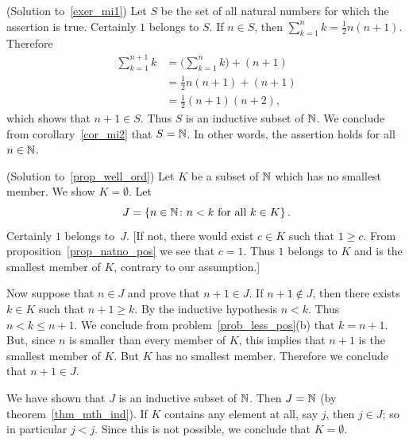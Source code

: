 \begin{prf}\label{sol_exer_mi1}(Solution to~\ref{exer_mi1})
Let $S$ be the set of all natural numbers for which the assertion is true.  Certainly $1$
belongs to $S$.  If $n \in S$, then $\sum_{k=1}^n k = \frac12 n(n + 1)$.  Therefore
 \begin{align*}
     \sum_{k=1}^{n+1}k &= \biggl(\sum_{k=1}^n k\biggr) + (n+1) \\
                       &= \frac12 n(n + 1) + (n + 1)           \\
                       &= \frac12(n + 1)(n + 2),
 \end{align*}
which shows that $n + 1 \in S$.  Thus $S$ is an inductive subset of $\mathbb{N}$.  We conclude from
corollary~\ref{cor_mi2} that $S = \mathbb{N}$. In other words, the assertion holds for all $n \in \mathbb{N}$.
\end{prf}

\begin{prf}\label{sol_prop_well_ord}(Solution to~\ref{prop_well_ord})
Let $K$ be a subset of $\mathbb{N}$ which has no smallest member.  We show $K = \emptyset$.  Let
  \[ J = \{n \in \mathbb{N} \colon n < k \text{ for all } k \in K\}\,. \]
Certainly $1$ belongs to~$J$.  [If not, there would exist $c \in K$ such that $1 \ge c$.  From
proposition~\ref{prop_natno_pos} we see that $c = 1$.  Thus $1$ belongs to $K$ and is the
smallest member of $K$, contrary to our assumption.]

Now suppose that $n \in J$ and prove that $n + 1 \in J$. If $n + 1 \notin J$, then there
exists $k \in K$ such that $n + 1 \ge k$.  By the inductive hypothesis $n < k$.  Thus $n < k
\le n + 1$.  We conclude from problem~\ref{prob_less_pos}(b) that $k = n + 1$. But, since $n$
is smaller than every member of $K$, this implies that $n + 1$ is the smallest member of $K$.
But $K$ has no smallest member.  Therefore we conclude that $n + 1 \in J$.

We have shown that $J$ is an inductive subset of $\mathbb{N}$.  Then $J = \mathbb{N}$ (by
theorem~\ref{thm_mth_ind}).  If $K$ contains any element at all, say $j$, then $j \in J$; so
in particular $j < j$. Since this is not possible, we conclude that $K = \emptyset$.
\end{prf}






























